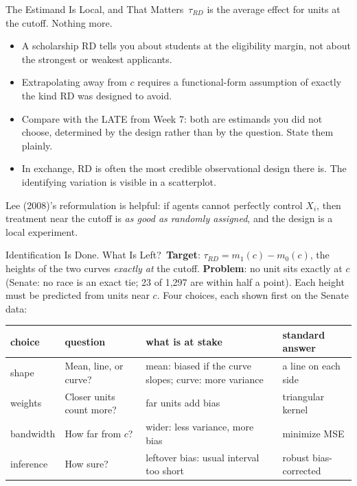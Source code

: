 \documentclass[aspectratio=169,11pt,xcolor=dvipsnames]{beamer}
\newcommand{\srct}[1]{#1}
\newcommand{\core}{\,\raisebox{0.6pt}{\textcolor{corestar}{$\bigstar$}}}
\begin{document}
\begin{frame}{The Estimand Is Local, and That Matters\core}
$\tau_{RD}$ is the average effect \alert{for units at the cutoff}. Nothing more.
\vskip4pt
\begin{itemize}\itemsep3pt
  \item A scholarship RD tells you about students at the eligibility margin, not
        about the strongest or weakest applicants.
  \item Extrapolating away from $c$ requires a functional-form assumption of
        exactly the kind RD was designed to avoid.
  \item Compare with the LATE from Week 7: both are estimands you did not choose,
        determined by the design rather than by the question. State them plainly.
  \item In exchange, RD is often the most credible observational design there is.
        The identifying variation is visible in a scatterplot.
\end{itemize}
\vskip3pt
\srct{Lee (2008)}'s reformulation is helpful: if agents cannot perfectly control
$X_i$, then treatment near the cutoff is \emph{as good as randomly assigned}, and
the design is a local experiment.
\end{frame}


\begin{frame}{Identification Is Done. What Is Left?\core}
\textbf{Target}: $\tau_{RD} = m_1(c) - m_0(c)$, the heights of the two curves
\emph{exactly at} the cutoff.
\vskip3pt
\textbf{Problem}: no unit sits exactly at $c$ (Senate: no race is an exact tie;
23 of 1,297 are within half a point). Each height must be \alert{predicted from
units near $c$}. Four choices, each shown first on the Senate data:
\vskip2pt
\begin{center}\footnotesize
\renewcommand{\arraystretch}{1.2}
\begin{tabular}{@{}l>{\raggedright}p{3.1cm}>{\raggedright}p{4.1cm}>{\raggedright\arraybackslash}p{2.5cm}@{}}
\toprule
choice & question & what is at stake & standard answer \\
\midrule
shape & Mean, line, or curve? & mean: biased if the curve slopes; curve: more variance & a line on each side \\
weights & Closer units count more? & far units add bias & triangular kernel \\
bandwidth & How far from $c$? & wider: less variance, more bias & minimize MSE \\
inference & How sure? & leftover bias: usual interval too short & robust bias-corrected \\
\bottomrule
\end{tabular}
\end{center}
\end{frame}
\end{document}
